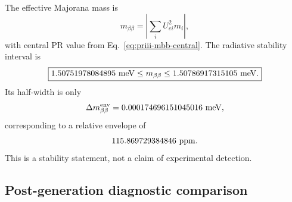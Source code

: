 \documentclass[11pt]{article}
\begin{document}
The effective Majorana mass is
\begin{equation}
m_{\beta\beta}
=
\left|
\sum_i U_{ei}^2m_i
\right|,
\end{equation}
with central PR value from Eq.~\eqref{eq:priii-mbb-central}.  The radiative stability interval is
\begin{equation}
\boxed{
1.50751978084895\ {\rm meV}
\leq
m_{\beta\beta}
\leq
1.50786917315105\ {\rm meV}.
}
\label{eq:priii-mbb-envelope}
\end{equation}
Its half-width is only
\begin{equation}
\Delta m_{\beta\beta}^{\rm env}
=
0.000174696151045016\ {\rm meV},
\end{equation}
corresponding to a relative envelope of
\begin{equation}
115.869729384846\ {\rm ppm}.
\end{equation}
This is a stability statement, not a claim of experimental detection.

\subsection{Post-generation diagnostic comparison}
\label{subsec:priii-neutrino-diagnostics}
\end{document}
